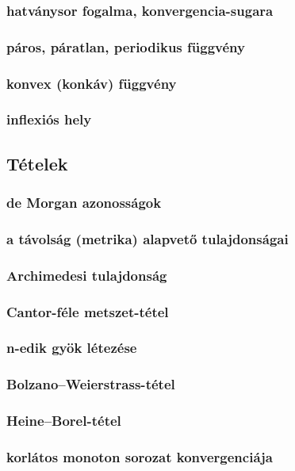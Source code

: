 \documentclass[12pt]{article}
\begin{document}
\subsubsection{hatványsor fogalma, konvergencia-sugara}
\subsubsection{páros, páratlan, periodikus
függvény}
\subsubsection{konvex (konkáv) függvény}
\subsubsection{inflexiós hely}


\subsection{Tételek}

\subsubsection{de Morgan azonosságok}
\subsubsection{a távolság (metrika) alapvető tulajdonságai}
\subsubsection{Archimedesi tulajdonság}
\subsubsection{Cantor-féle metszet-tétel}
\subsubsection{n-edik gyök létezése}
\subsubsection{Bolzano–Weierstrass-tétel}
\subsubsection{Heine–Borel-tétel}
\subsubsection{korlátos monoton sorozat konvergenciája}
\end{document}
